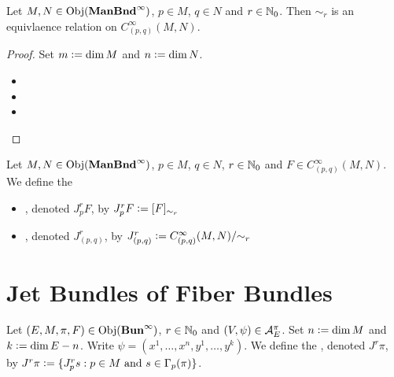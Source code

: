 \documentclass{book}
\begin{document}
\begin{ex}
	Let $M, N \in \operatorname{Obj}(\operatorname*{\text{\textbf{ManBnd}}^{\infty}})$, $p \in M$, $q \in N$ and $r \in \mathbb{N}_0$. Then $\sim_r$ is an equivlaence relation on $C^{\infty}_{(p,q)}(M, N)$.
\end{ex}

\begin{proof}
	Set $m \vcentcolon= \dim M$ and $n \vcentcolon= \dim N$. 
	\begin{itemize}
		\item 
		\item 
		\item 
	\end{itemize}
\end{proof}

\begin{defn}
	Let $M, N \in \operatorname{Obj}(\operatorname*{\text{\textbf{ManBnd}}^{\infty}})$, $p \in M$, $q \in N$, $r \in \mathbb{N}_0$ and $F \in C^{\infty}_{(p,q)}(M, N)$. We define the 
	\begin{itemize}
		\item {}, denoted $J^r_p F$, by $J^r_p F \vcentcolon= [F]_{\sim_r}$
		\item {}, denoted $J_{(p,q)}^r$, by $J_{(p,q)}^r \vcentcolon= C^{\infty}_{(p, q)}(M, N) / {\sim_r}$
	\end{itemize}
\end{defn}













































\newpage
\section{Jet Bundles of Fiber Bundles}

\begin{defn}
	Let $(E, M, \pi, F) \in \operatorname{Obj}(\operatorname*{\text{\textbf{Bun}}^{\infty}})$, $r \in \mathbb{N}_0$ and $(V, \psi) \in \mathcal{A}_E^{\pi}$. Set $n \vcentcolon= \dim M$ and $k \vcentcolon= \dim E - n$. Write $\psi = (x^1, \ldots, x^n, y^1, \ldots, y^k)$. We define the , denoted $J^r \pi$, by $J^r \pi \vcentcolon= \{ J^r_p s: p \in M \text{ and } s \in \Gamma_p(\pi)\}$.
\end{defn}
\end{document}
